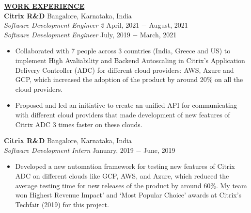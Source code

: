 \documentclass{article}
\begin{document}
% 
%
\noindent \textbf{\underline{WORK EXPERIENCE}} \\
\noindent \textbf{Citrix R\&D} \hfill Bangalore, Karnataka, India \\
\textit{Software Development Engineer 2} \hfill April, 2021 $-$ August, 2021 \\
\textit{Software Development Engineer} \hfill July, 2019 $-$ March, 2021 
\begin{itemize}[noitemsep,nolistsep,leftmargin=*]
\item {Collaborated with 7 people across 3 countries (India, Greece and US) to implement High Avaliability and Backend Autoscaling in Citrix's Application Delivery Controller (ADC) for different cloud providers: AWS, Azure and GCP, which increased the adoption of the product by around 20\% on all the cloud providers.}
\item {Proposed and led an initiative to create an unified API for communicating with different cloud providers that made development of new features of Citrix ADC 3 times faster on these clouds. \\}
\end{itemize}

\noindent \textbf{Citrix R\&D} \hfill Bangalore, Karnataka, India \\
\textit{Software Development Intern} \hfill January, 2019 $-$ June, 2019
\begin{itemize}[noitemsep,nolistsep,leftmargin=*]
\item {Developed a new automation framework for testing new features of Citrix ADC on different clouds like GCP, AWS, and Azure, which reduced the average testing time for new releases of the product by around 60\%. My team won Highest Revenue Impact’ and ‘Most Popular Choice’ awards at Citrix's Techfair (2019) for this project.\\}
\end{itemize}
\end{document}
